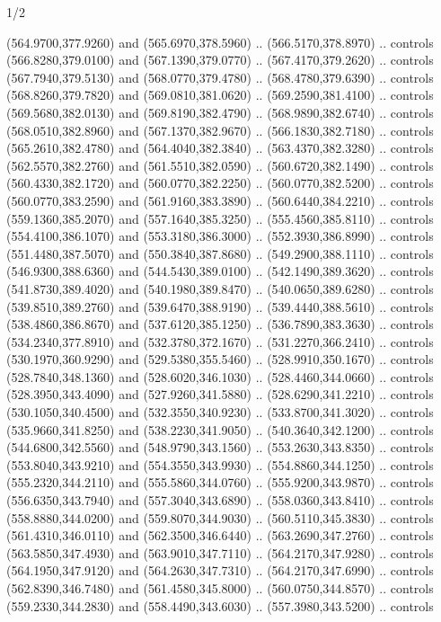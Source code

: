 \begin{flagdescription}{1/2}
\begin{scope}[xshift=0.5\flaglength,yshift=0.5\flagwidth,scale=\flagwidth/759]
\begin{scope}[y=0.8pt, x=0.8pt, yscale=-1,shift={(-720,-480)}]
\begin{scope}[cm={{1.14637,0.0,0.0,1.17117,(33.17849,82.1384)}}]
  (564.9700,377.9260) and (565.6970,378.5960) .. (566.5170,378.8970) .. controls
  (566.8280,379.0100) and (567.1390,379.0770) .. (567.4170,379.2620) .. controls
  (567.7940,379.5130) and (568.0770,379.4780) .. (568.4780,379.6390) .. controls
  (568.8260,379.7820) and (569.0810,381.0620) .. (569.2590,381.4100) .. controls
  (569.5680,382.0130) and (569.8190,382.4790) .. (568.9890,382.6740) .. controls
  (568.0510,382.8960) and (567.1370,382.9670) .. (566.1830,382.7180) .. controls
  (565.2610,382.4780) and (564.4040,382.3840) .. (563.4370,382.3280) .. controls
  (562.5570,382.2760) and (561.5510,382.0590) .. (560.6720,382.1490) .. controls
  (560.4330,382.1720) and (560.0770,382.2250) .. (560.0770,382.5200) .. controls
  (560.0770,383.2590) and (561.9160,383.3890) .. (560.6440,384.2210) .. controls
  (559.1360,385.2070) and (557.1640,385.3250) .. (555.4560,385.8110) .. controls
  (554.4100,386.1070) and (553.3180,386.3000) .. (552.3930,386.8990) .. controls
  (551.4480,387.5070) and (550.3840,387.8680) .. (549.2900,388.1110) .. controls
  (546.9300,388.6360) and (544.5430,389.0100) .. (542.1490,389.3620) .. controls
  (541.8730,389.4020) and (540.1980,389.8470) .. (540.0650,389.6280) .. controls
  (539.8510,389.2760) and (539.6470,388.9190) .. (539.4440,388.5610) .. controls
  (538.4860,386.8670) and (537.6120,385.1250) .. (536.7890,383.3630) .. controls
  (534.2340,377.8910) and (532.3780,372.1670) .. (531.2270,366.2410) .. controls
  (530.1970,360.9290) and (529.5380,355.5460) .. (528.9910,350.1670) .. controls
  (528.7840,348.1360) and (528.6020,346.1030) .. (528.4460,344.0660) .. controls
  (528.3950,343.4090) and (527.9260,341.5880) .. (528.6290,341.2210) .. controls
  (530.1050,340.4500) and (532.3550,340.9230) .. (533.8700,341.3020) .. controls
  (535.9660,341.8250) and (538.2230,341.9050) .. (540.3640,342.1200) .. controls
  (544.6800,342.5560) and (548.9790,343.1560) .. (553.2630,343.8350) .. controls
  (553.8040,343.9210) and (554.3550,343.9930) .. (554.8860,344.1250) .. controls
  (555.2320,344.2110) and (555.5860,344.0760) .. (555.9200,343.9870) .. controls
  (556.6350,343.7940) and (557.3040,343.6890) .. (558.0360,343.8410) .. controls
  (558.8880,344.0200) and (559.8070,344.9030) .. (560.5110,345.3830) .. controls
  (561.4310,346.0110) and (562.3500,346.6440) .. (563.2690,347.2760) .. controls
  (563.5850,347.4930) and (563.9010,347.7110) .. (564.2170,347.9280) .. controls
  (564.1950,347.9120) and (564.2630,347.7310) .. (564.2170,347.6990) .. controls
  (562.8390,346.7480) and (561.4580,345.8000) .. (560.0750,344.8570) .. controls
  (559.2330,344.2830) and (558.4490,343.6030) .. (557.3980,343.5200) .. controls

\end{scope}
\end{scope}
\end{scope}
\end{flagdescription}
